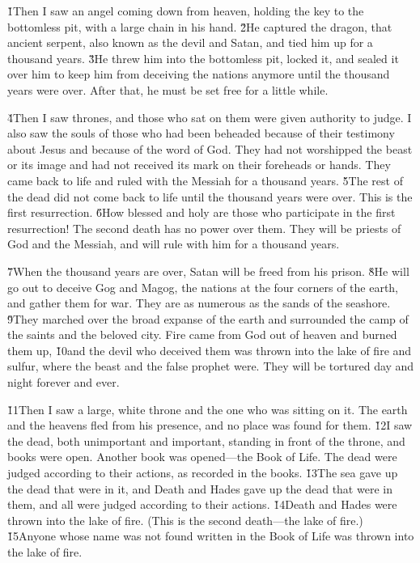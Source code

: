 \v{1}Then I saw an angel coming down from heaven, holding the key to the bottomless pit, with a large chain in his hand. \v{2}He captured the dragon, that ancient serpent, also known as the devil and Satan, and tied him up for a thousand years. \v{3}He threw him into the bottomless pit, locked it, and sealed it over him to keep him from deceiving the nations anymore until the thousand years were over. After that, he must be set free for a little while.

\v{4}Then I saw thrones, and those who sat on them were given authority to judge. I also saw the souls of those who had been beheaded because of their testimony about Jesus and because of the word of God. They had not worshipped the beast or its image and had not received its mark on their foreheads or hands. They came back to life and ruled with the Messiah for a thousand years. \v{5}The rest of the dead did not come back to life until the thousand years were over. This is the first resurrection. \v{6}How blessed and holy are those who participate in the first resurrection! The second death has no power over them. They will be priests of God and the Messiah, and will rule with him for a thousand years.

\v{7}When the thousand years are over, Satan will be freed from his prison. \v{8}He will go out to deceive Gog and Magog, the nations at the four corners of the earth, and gather them for war. They are as numerous as the sands of the seashore. \v{9}They marched over the broad expanse of the earth and surrounded the camp of the saints and the beloved city. Fire came from God out of heaven and burned them up, \v{10}and the devil who deceived them was thrown into the lake of fire and sulfur, where the beast and the false prophet were. They will be tortured day and night forever and ever.

\v{11}Then I saw a large, white throne and the one who was sitting on it. The earth and the heavens fled from his presence, and no place was found for them. \v{12}I saw the dead, both unimportant and important, standing in front of the throne, and books were open. Another book was opened---the Book of Life. The dead were judged according to their actions, as recorded in the books. \v{13}The sea gave up the dead that were in it, and Death and Hades gave up the dead that were in them, and all were judged according to their actions. \v{14}Death and Hades were thrown into the lake of fire. (This is the second death---the lake of fire.) \v{15}Anyone whose name was not found written in the Book of Life was thrown into the lake of fire.

